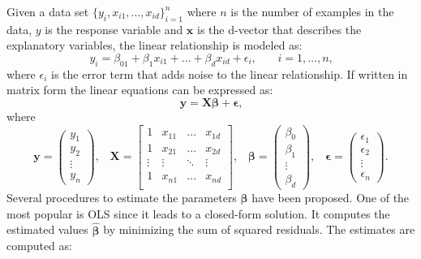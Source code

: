 Given a data set $\{y_{i}, x_{i1}, \dots, x_{id}\}^{n}_{i=1}$ where $n$ is the number of examples in the data, $y$ is the response variable and $\mathbf{x}$ is the d-vector that describes the explanatory variables, the linear relationship is modeled as:
\begin{equation}
    y_i = \beta_01 + \beta_1x_{i1} + \dots + \beta_dx_{id} + \epsilon_i \text{,}  \qquad i=1,\dots,n \text{,}
\end{equation}
where $\epsilon_i$ is the error term that adds noise to the linear relationship. If written in matrix form the linear equations can be expressed as:
\begin{equation}
    \mathbf{y} = {\mathbf{X}\bm{\beta}} + \bm{\epsilon} \text{,}  
\end{equation}
where 
\begin{equation}
    \mathbf{y} = \begin{pmatrix} y_1 \\ y_2 \\ \vdots \\ y_n\end{pmatrix}\text{,} \quad
    \mathbf{X} = \begin{bmatrix} 1 & x_{11} & \dots & x_{1d}  \\ 
                                 1 & x_{21} & \dots & x_{2d}  \\   
                                 \vdots & \vdots & \ddots & \vdots \\
                                 1 & x_{n1} & \dots & x_{nd} \\
                                 \end{bmatrix}\text{,} \quad
    \bm{\beta} = \begin{pmatrix} \beta_0 \\ \beta_1 \\ \vdots \\ \beta_d\end{pmatrix}\text{,} \quad
    \bm{\epsilon} = \begin{pmatrix} \epsilon_1 \\ \epsilon_2 \\ \vdots \\ \epsilon_n\end{pmatrix}\text{.}
\end{equation}
Several procedures to estimate the parameters $\bm{\beta}$ have been proposed. One of the most popular is \acf{OLS} since it leads to a closed-form solution. It computes the estimated values $\hat{\bm{\beta}}$ by minimizing the sum of squared residuals. The estimates are computed as: 
